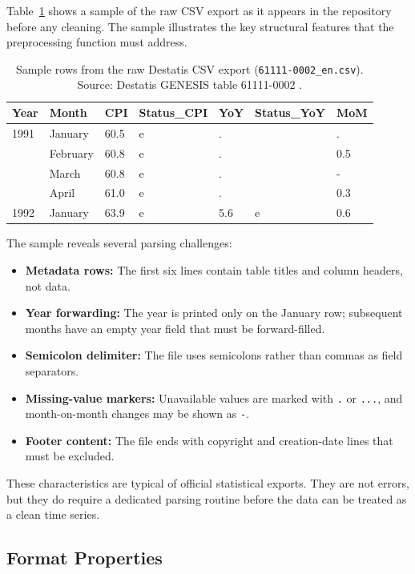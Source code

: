 Table~\ref{tab:raw-cpi-record} shows a sample of the raw CSV export as it appears in the repository before any cleaning. The sample illustrates the key structural features that the preprocessing function must address.

\begin{table}[htbp]
	\centering
	\caption{Sample rows from the raw Destatis CSV export (\texttt{61111-0002\_en.csv}). Source: Destatis GENESIS table 61111-0002 \cite{DestatisCPIQuality2023,DestatisCPIWeighting2023}.}
	\label{tab:raw-cpi-record}
	\begin{tabular}{lllllll}
		\hline
		Year & Month & CPI & Status\_CPI & YoY & Status\_YoY & MoM \\
		\hline
		1991 & January & 60.5 & e & . & & . \\
		 & February & 60.8 & e & . & & 0.5 \\
		 & March & 60.8 & e & . & & - \\
		 & April & 61.0 & e & . & & 0.3 \\
		1992 & January & 63.9 & e & 5.6 & e & 0.6 \\
		\hline
	\end{tabular}
\end{table}

The sample reveals several parsing challenges:

\begin{itemize}
	\item \textbf{Metadata rows:} The first six lines contain table titles and column headers, not data.
	\item \textbf{Year forwarding:} The year is printed only on the January row; subsequent months have an empty year field that must be forward-filled.
	\item \textbf{Semicolon delimiter:} The file uses semicolons rather than commas as field separators.
	\item \textbf{Missing-value markers:} Unavailable values are marked with \texttt{.} or \texttt{...}, and month-on-month changes may be shown as \texttt{-}.
	\item \textbf{Footer content:} The file ends with copyright and creation-date lines that must be excluded.
\end{itemize}

These characteristics are typical of official statistical exports. They are not errors, but they do require a dedicated parsing routine before the data can be treated as a clean time series.

\subsection{Format Properties}

